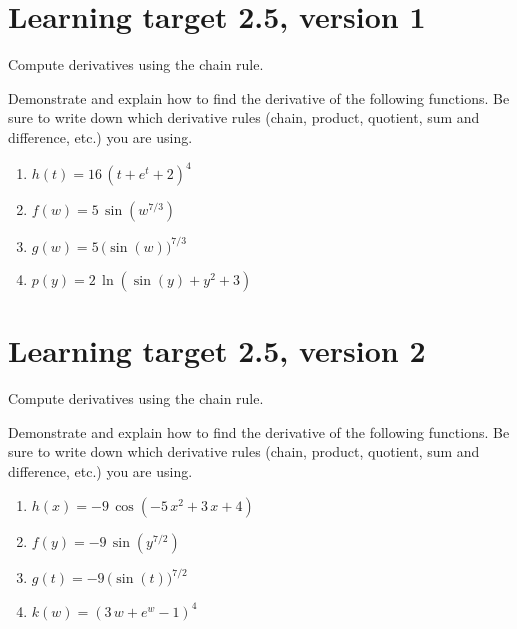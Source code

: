 
\usepackage{pgfplots}

\everymath{\displaystyle}


\section{Learning target 2.5, version 1}

Compute derivatives using the chain rule.

\hrulefill

Demonstrate and explain how to find the derivative of the following functions. Be sure to write down which derivative rules (chain, product, quotient, sum and difference, etc.) you are using.

\begin{enumerate}
    \item \(h(t)= 16 \, {\left(t + e^{t} + 2\right)}^{4}\)
    \vfill
    \item \(f(w)= 5 \, \sin\left(w^{7/3}\right)\)
    \vfill
    \item \(g(w)= 5 \, \Big(\sin\left(w\right)\Big)^{7/3}\)
    \vfill
    \item \(p(y) = 2\, \ln\left(\sin(y) + y^2 + 3\right)\)
    \vfill
\end{enumerate}



\pagebreak

\section{Learning target 2.5, version 2}

Compute derivatives using the chain rule.

\hrulefill

Demonstrate and explain how to find the derivative of the following functions. Be sure to write down which derivative rules (chain, product, quotient, sum and difference, etc.) you are using.

\begin{enumerate}
    \item \(h(x)= -9 \, \cos\left(-5 \, x^{2} + 3 \, x + 4\right)\)
    \vfill
    \item \(f(y)= -9 \, \sin\left(y^{7/2}\right)\)
    \vfill
    \item \(g(t)= -9 \, \Big(\sin\left(t\right)\Big)^{7/2}\)
    \vfill
    \item \(k(w)= {\left(3 \, w + e^{w} - 1\right)}^{4}\)
    \vfill
\end{enumerate}


